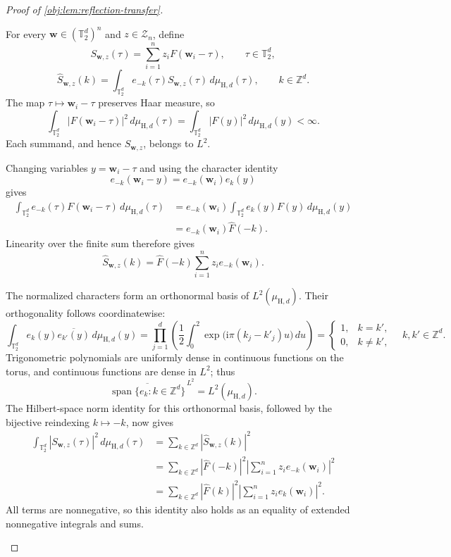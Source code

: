 \documentclass[11pt]{article}
\begin{document}
\begin{proof}[Proof of \cref{obj:lem:reflection-transfer}]
\begin{enumerate}
For every
\(\mathbf w\in(\mathbb T_2^d)^n\) and \(z\in\mathcal Z_n\), define
\[
S_{\mathbf w,z}(\tau)
=\sum_{i=1}^n z_i F(\mathbf w_i-\tau),
\qquad \tau\in\mathbb T_2^d,
\]
\[
\widehat S_{\mathbf w,z}(k)
=\int_{\mathbb T_2^d}
e_{-k}(\tau)S_{\mathbf w,z}(\tau)
\,d\mu_{\mathrm H,d}(\tau),
\qquad k\in\mathbb Z^d.
\]
The map \(\tau\mapsto\mathbf w_i-\tau\) preserves Haar measure, so
\[
\int_{\mathbb T_2^d}|F(\mathbf w_i-\tau)|^2
\,d\mu_{\mathrm H,d}(\tau)
=\int_{\mathbb T_2^d}|F(y)|^2\,d\mu_{\mathrm H,d}(y)<\infty.
\]
Each summand, and hence \(S_{\mathbf w,z}\), belongs to \(L^2\).

Changing variables \(y=\mathbf w_i-\tau\) and using the character
identity
\[
e_{-k}(\mathbf w_i-y)=e_{-k}(\mathbf w_i)e_k(y)
\]
gives
\[
\begin{aligned}
\int_{\mathbb T_2^d}
e_{-k}(\tau)F(\mathbf w_i-\tau)\,d\mu_{\mathrm H,d}(\tau)
&=e_{-k}(\mathbf w_i)
  \int_{\mathbb T_2^d}e_k(y)F(y)\,d\mu_{\mathrm H,d}(y)\\
&=e_{-k}(\mathbf w_i)\widehat F(-k).
\end{aligned}
\]
Linearity over the finite sum therefore gives
\[
\widehat S_{\mathbf w,z}(k)
=\widehat F(-k)\sum_{i=1}^n z_i e_{-k}(\mathbf w_i).
\]

The normalized characters form an orthonormal basis of
\(L^2(\mu_{\mathrm H,d})\). Their orthogonality follows coordinatewise:
\[
\int_{\mathbb T_2^d}
e_k(y)\overline{e_{k'}(y)}\,d\mu_{\mathrm H,d}(y)
=
\prod_{j=1}^d
\left(\frac12\int_0^2
  \exp\bigl(\mathrm i\pi(k_j-k'_j)u\bigr)\,du\right)
=
\begin{cases}
1,&k=k',\\
0,&k\neq k',
\end{cases}
\quad k,k'\in\mathbb Z^d.
\]
Trigonometric polynomials are uniformly dense in continuous functions
on the torus, and continuous functions are dense in \(L^2\); thus
\[
\overline{\operatorname{span}\{e_k:k\in\mathbb Z^d\}}^{\,L^2}
=L^2(\mu_{\mathrm H,d}).
\]
The Hilbert-space norm identity for this orthonormal basis, followed by
the bijective reindexing \(k\mapsto-k\), now gives
\[
\begin{aligned}
\int_{\mathbb T_2^d}|S_{\mathbf w,z}(\tau)|^2
\,d\mu_{\mathrm H,d}(\tau)
&=\sum_{k\in\mathbb Z^d}|\widehat S_{\mathbf w,z}(k)|^2\\
&=\sum_{k\in\mathbb Z^d}
|\widehat F(-k)|^2
\left|\sum_{i=1}^n z_i e_{-k}(\mathbf w_i)\right|^2\\
&=\sum_{k\in\mathbb Z^d}
|\widehat F(k)|^2
\left|\sum_{i=1}^n z_i e_k(\mathbf w_i)\right|^2.
\end{aligned}
\]
All terms are nonnegative, so this identity also holds as an equality
of extended nonnegative integrals and sums.


\end{enumerate}
\end{proof}
\end{document}
